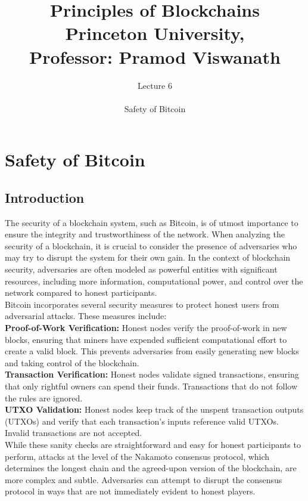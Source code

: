 \documentclass{report}
\title{\Huge{Principles of Blockchains \\ Princeton University,\\
		Professor: Pramod Viswanath}}
\author{\huge{Lecture 6} \\\\ Safety of Bitcoin}
\begin{document}
\maketitle
\newpage%
\tableofcontents
\pagebreak

\chapter{Safety of Bitcoin}

\section{Introduction}

The security of a blockchain system, such as Bitcoin, is of utmost importance to ensure the integrity and trustworthiness of the network. When analyzing the security of a blockchain, it is crucial to consider the presence of adversaries who may try to disrupt the system for their own gain. In the context of blockchain security, adversaries are often modeled as powerful entities with significant resources, including more information, computational power, and control over the network compared to honest participants.\\
Bitcoin incorporates several security measures to protect honest users from adversarial attacks. These measures include:\\
\textbf{Proof-of-Work Verification:} Honest nodes verify the proof-of-work in new blocks, ensuring that miners have expended sufficient computational effort to create a valid block. This prevents adversaries from easily generating new blocks and taking control of the blockchain.\\
\textbf{Transaction Verification:} Honest nodes validate signed transactions, ensuring that only rightful owners can spend their funds. Transactions that do not follow the rules are ignored.\\
\textbf{UTXO Validation:} Honest nodes keep track of the unspent transaction outputs (UTXOs) and verify that each transaction's inputs reference valid UTXOs. Invalid transactions are not accepted.\\
While these sanity checks are straightforward and easy for honest participants to perform, attacks at the level of the Nakamoto consensus protocol, which determines the longest chain and the agreed-upon version of the blockchain, are more complex and subtle. Adversaries can attempt to disrupt the consensus protocol in ways that are not immediately evident to honest players.\\
\end{document}
